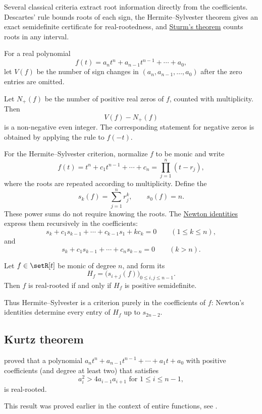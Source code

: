 Several classical criteria extract root information directly from the
coefficients.  Descartes' rule bounds roots of each sign, the
Hermite--Sylvester theorem gives an exact semidefinite certificate for
real-rootedness, and \hyperref[sturmRootCounting]{Sturm's theorem} counts
roots in any interval.

For a real polynomial
\[
  f(t)=a_nt^n+a_{n-1}t^{n-1}+\dotsb+a_0,
\]
let $V(f)$ be the number of sign changes in
$(a_n,a_{n-1},\dotsc,a_0)$ after the zero entries are omitted.

\begin{theorem}
\label{descartesRuleOfSigns}
Let $N_+(f)$ be the number of positive real zeros of $f$, counted with
multiplicity.  Then
\[
  V(f)-N_+(f)
\]
is a non-negative even integer.  The corresponding statement for negative
zeros is obtained by applying the rule to $f(-t)$.
\end{theorem}

For the Hermite--Sylvester criterion, normalize $f$ to be monic and write
\[
  f(t)=t^n+c_1t^{n-1}+\dotsb+c_n
       =\prod_{j=1}^n(t-r_j),
\]
where the roots are repeated according to multiplicity.  Define the
\label{polynomialNewtonSums}
\[
  s_k(f)=\sum_{j=1}^n r_j^k,
  \qquad s_0(f)=n.
\]
These power sums do not require knowing the roots.  The
\hyperref[standardNewton]{Newton identities} express them recursively in the
coefficients:
\[
  s_k+c_1s_{k-1}+\dotsb+c_{k-1}s_1+kc_k=0
  \qquad (1\leq k\leq n),
\]
and
\[
  s_k+c_1s_{k-1}+\dotsb+c_ns_{k-n}=0
  \qquad (k>n).
\]

\begin{theorem}
\label{hermiteSylvesterTheorem}
Let $f\in\setR[t]$ be monic of degree $n$, and form its
\label{hermiteMatrix}
\[
  H_f=\bigl(s_{i+j}(f)\bigr)_{0\leq i,j\leq n-1}.
\]
Then $f$ is real-rooted if and only if $H_f$ is positive semidefinite.
\end{theorem}

Thus Hermite--Sylvester is a criterion purely in the coefficients of $f$:
Newton's identities determine every entry of $H_f$ up to $s_{2n-2}$.



\subsection[kurtzTheorem]{Kurtz theorem}

\begin{theorem}
 proved that a polynomial
$a_n t^n + a_{n-1}t^{n-1} + \dotsb + a_1 t + a_0$
with positive coefficients (and degree at least two) that satisfies
\[
 a_i^2 \gt 4a_{i-1}a_{i+1} \text{ for } 1 \leq i \leq n-1,
\]
is real-rooted.
\end{theorem}
This result was proved earlier in the context of entire functions, see \cite{Hutchinson1923}.


